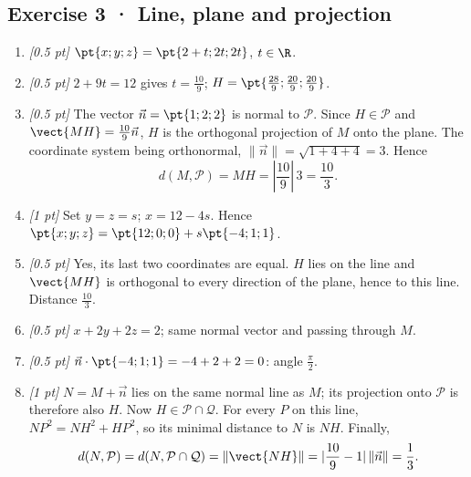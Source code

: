 \subsection*{Exercise 3 · Line, plane and projection}\begin{enumerate}

\item \textit{[0.5 pt]} $\pt{x;y;z}=\pt{2+t;2t;2t}$, $t\in\R$.

\item \textit{[0.5 pt]} $2+9t=12$ gives $t=\frac{10}{9}$; $H=\pt{\frac{28}{9};\frac{20}{9};\frac{20}{9}}$.

\item \textit{[0.5 pt]} The vector $\vec n=\pt{1;2;2}$ is normal to $\mathcal P$. Since $H\in\mathcal P$ and $\vect{MH}=\frac{10}{9}\vec n$, $H$ is the orthogonal projection of $M$ onto the plane. The coordinate system being orthonormal, $\|\vec n\|=\sqrt{1+4+4}=3$. Hence
\[d(M,\mathcal P)=MH=|\frac{10}{9}|\,3=\frac{10}{3}.\]

\item \textit{[1 pt]} Set $y=z=s$; $x=12-4s$. Hence $\pt{x;y;z}=\pt{12;0;0}+s\pt{-4;1;1}$.

\item \textit{[0.5 pt]} Yes, its last two coordinates are equal. $H$ lies on the line and $\vect{MH}$ is orthogonal to every direction of the plane, hence to this line. Distance $\frac{10}{3}$.

\item \textit{[0.5 pt]} $x+2y+2z=2$; same normal vector and passing through $M$.

\item \textit{[0.5 pt]} $\vec n\cdot\pt{-4;1;1}=-4+2+2=0$: angle $\frac{\pi}{2}$.

\item \textit{[1 pt]} $N=M+\vec n$ lies on the same normal line as $M$; its projection onto $\mathcal P$ is therefore also $H$. Now $H\in\mathcal P\cap\mathcal Q$. For every $P$ on this line, $NP^2=NH^2+HP^2$, so its minimal distance to $N$ is $NH$. Finally,
\[d(N,\mathcal P)=d(N,\mathcal P\cap\mathcal Q)=\|\vect{NH}\|=|\frac{10}{9}-1|\,\|\vec n\|=\frac{1}{3}.\]

\end{enumerate}

